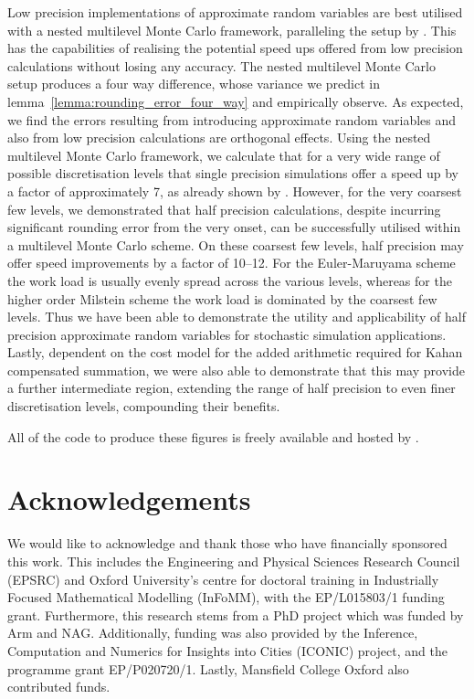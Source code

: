 \documentclass[9pt,a4paper,english]{extarticle}
\begin{document}
Low precision implementations of approximate random variables are best utilised with a nested multilevel Monte Carlo framework, paralleling the setup by \citet{giles2020approximating}. This has the capabilities of realising the potential speed ups offered from low precision calculations without losing any accuracy. The nested multilevel Monte Carlo setup produces a four way difference, whose variance we predict in lemma~\ref{lemma:rounding_error_four_way} and empirically observe. As expected, we find the errors resulting from introducing approximate random variables and also from low precision calculations are orthogonal effects. Using the nested multilevel Monte Carlo framework, we calculate that for a very wide range of possible discretisation levels that single precision simulations offer a speed up by a factor of approximately 7, as already shown by \citet{giles2020approximating}. However, for the very coarsest few levels, we demonstrated that half precision calculations, despite incurring significant rounding error from the very onset, can be successfully utilised within a multilevel Monte Carlo scheme. On these coarsest few levels, half precision may offer speed improvements by a factor of 10--12. For the Euler-Maruyama scheme the work load is usually evenly spread across the various levels, whereas for the higher order Milstein scheme the work load is dominated by the coarsest few levels. Thus we have been able to demonstrate the utility and applicability of half precision approximate random variables for stochastic simulation applications. Lastly, dependent on the cost model for the added arithmetic required for Kahan compensated summation, we were also able to demonstrate that this may provide a further intermediate region, extending the range of half precision to even finer discretisation levels, compounding their benefits. 

All of the code to produce these figures is freely available and hosted by \citet{sheridan2020low_precision}. 

\section{Acknowledgements}
\label{sec:acknowledgements}

We would like to acknowledge and thank those who have financially sponsored this work. This includes the Engineering and Physical Sciences Research Council (EPSRC) and Oxford University's centre for doctoral training in Industrially Focused Mathematical Modelling (InFoMM), with the EP/L015803/1 funding grant. Furthermore, this research stems from a PhD project \citep{sheridan2020nested} which was funded by Arm and NAG. Additionally, funding was also provided by the Inference, Computation and Numerics for Insights into Cities (ICONIC) project, and the programme grant EP/P020720/1. Lastly, Mansfield College Oxford also contributed funds.  



\end{document}
